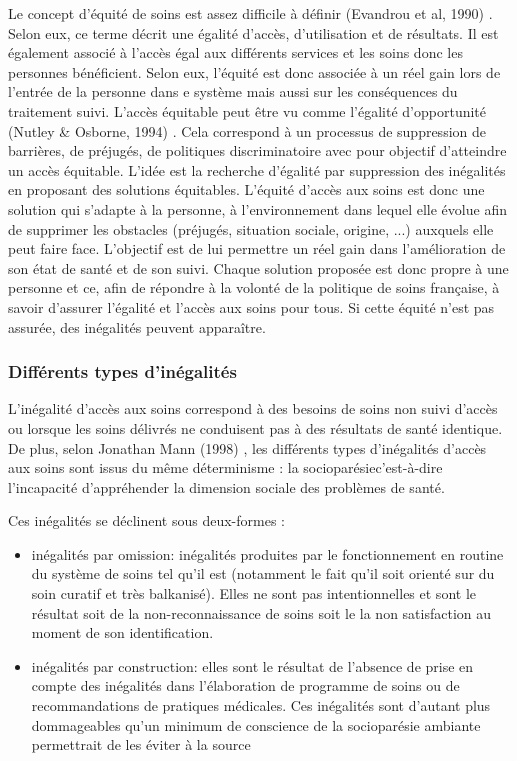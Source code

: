 Le concept d'équité de soins est assez difficile à définir (Evandrou et al, 1990) \cite{Evandrou1990}. Selon eux, ce terme décrit une égalité d'accès, d'utilisation et de résultats. Il est également associé à l'accès égal aux différents services et les soins donc les personnes bénéficient. Selon eux, l'équité est donc associée à un réel gain lors de l'entrée de la personne dans e système mais aussi sur les conséquences du traitement suivi.
\og L'accès équitable\fg{} peut être vu comme \og l'égalité d'opportunité\fg{} (Nutley \& Osborne, 1994) \cite{NutleyOsborne1994}. Cela correspond à un processus de suppression de barrières, de préjugés, de politiques discriminatoire avec pour objectif d'atteindre un accès équitable. L'idée est la recherche d'égalité par suppression des inégalités en proposant des solutions équitables. 
L'équité d'accès aux soins est donc une solution qui s'adapte à la personne, à l'environnement dans lequel elle évolue afin de supprimer les obstacles (préjugés, situation sociale, origine, ...) auxquels elle peut faire face. L'objectif est de lui permettre un réel gain dans l'amélioration de son état de santé et de son suivi. Chaque solution proposée est donc propre à une personne et ce, afin de répondre à la volonté de la politique de soins française, à savoir d'assurer l'égalité et l'accès aux soins pour tous.
Si cette équité n'est pas assurée, des inégalités peuvent apparaître.

\subsubsection{Différents types d'inégalités}

L'inégalité d'accès aux soins correspond à des besoins de soins non suivi d'accès ou lorsque les soins délivrés ne conduisent pas à des résultats de santé identique. 
De plus, selon Jonathan Mann (1998) \cite{Mann1998}, les différents types d'inégalités d'accès aux soins sont issus du même déterminisme : la \og socioparésie\fg c'est-à-dire l'incapacité d'appréhender la dimension sociale des problèmes de santé.

Ces inégalités se déclinent sous deux-formes : 
\begin{itemize}
\item inégalités par \og omission\fg : inégalités produites par le fonctionnement en routine du système de soins tel qu'il est (notamment le fait qu'il soit orienté sur du soin curatif et très balkanisé). Elles ne sont pas intentionnelles et sont le résultat soit de la non-reconnaissance de soins soit le la non satisfaction au moment de son identification.
\item  inégalités par \og construction\fg : elles sont le résultat de l'absence de prise en compte des inégalités dans l'élaboration de programme de soins ou de recommandations de pratiques médicales. Ces inégalités sont d'autant plus dommageables qu'un minimum de conscience de la socioparésie ambiante permettrait de les éviter à la source
\end{itemize}

